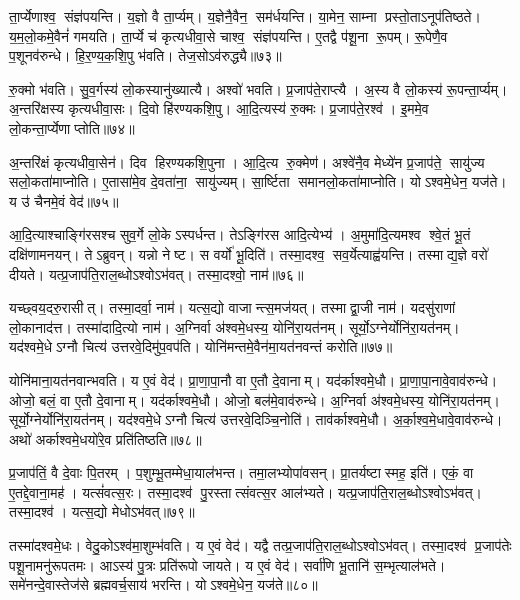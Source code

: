 ता॒र्प्येणाश्व॒ संज्ञ॑पयन्ति।
य॒ज्ञो वै ता॒र्प्यम्।
य॒ज्ञेनै॒वैन॒ सम॑र्धयन्ति।
या॒मेन॒ साम्ना प्रस्तो॒ताऽनूप॑तिष्ठते।
य॒म॒लो॒कमे॒वैनं॑ गमयति।
ता॒र्प्ये च॑ कृत्यधीवा॒से चाश्व॒ संज्ञ॑पयन्ति।
ए॒तद्वै प॑शू॒ना रू॒पम्।
रू॒पेणै॒व प॒शूनव॑रुन्धे।
हि॒र॒ण्य॒क॒शि॒पु भ॑वति।
तेज॒सोऽव॑रुद्ध्यै॥७३॥

रु॒क्मो भ॑वति।
सु॒व॒र्गस्य॑ लो॒कस्यानु॑ख्यात्यै।
अश्वो॑ भवति।
प्र॒जाप॑ते॒राप्त्यै।
अ॒स्य वै लो॒कस्य॑ रू॒पन्ता॒र्प्यम्।
अ॒न्तरि॑क्षस्य कृत्यधीवा॒सः।
दि॒वो हि॑रण्यकशि॒पु।
आ॒दि॒त्यस्य॑ रु॒क्मः।
प्र॒जाप॑ते॒रश्व॑।
इ॒ममे॒व लो॒कन्ता॒र्प्येणाप्तोति॥७४॥

अ॒न्तरि॑क्षं कृत्यधीवा॒सेन॑।
दिव हिरण्यकशि॒पुना।
आ॒दि॒त्य रु॒क्मेण॑।
अश्वे॑नै॒व मेध्ये॑न प्र॒जाप॑ते॒ सायु॑ज्य सलो॒कता॑माप्नोति।
ए॒तासा॑मे॒व दे॒वता॑ना॒ सायु॑ज्यम्।
सा॒र्ष्टिता समानलो॒कता॑माप्नोति।
योऽश्वमे॒धेन॒ यज॑ते।
य उ॑ चैनमे॒वं वेद॑॥७५॥\anuvakamend[अव॑रुध्या आप्नोत्य॒ष्टौ च॑]

आ॒दि॒त्याश्चाङ्गि॑रसश्च सुव॒र्गे लो॒केऽस्पर्धन्त।
तेऽङ्गि॑रस आदि॒त्येभ्य॑।
अ॒मुमा॑दि॒त्यमश्व श्वे॒तं भू॒तं दक्षि॑णामनयन्।
तेऽब्रुवन्।
यन्नो नेष्ट।
स वर्यो॑ भू॒दिति॑।
तस्मा॒दश्व॒ सव॒र्येत्याह्व॑यन्ति।
तस्माद्य॒ज्ञे वरो॑ दीयते।
यत्प्र॒जाप॑ति॒राल॒ब्धोऽश्वोऽभ॑वत्।
तस्मा॒दश्वो॒ नाम॑॥७६॥

यच्छ्वय॒दरु॒रासीत्।
तस्मा॒दर्वा॒ नाम॑।
यत्स॒द्यो वाजान्त्स॒मज॑यत्।
तस्माद्वा॒जी नाम॑।
यदसु॑राणां लो॒कानाद॑त्त।
तस्मा॑दादि॒त्यो नाम॑।
अ॒ग्निर्वा अ॑श्वमे॒धस्य॒ योनि॑रा॒यत॑नम्।
सूर्यो॒ऽग्नेर्योनि॑रा॒यत॑नम्।
यद॑श्वमे॒धेऽग्नौ चित्य॑ उत्तरवे॒दिमु॑प॒वप॑ति।
योनि॑मन्तमे॒वैन॑मा॒यत॑नवन्तं करोति॥७७॥

योनि॑माना॒यत॑नवान्भवति।
य ए॒वं वेद॑।
प्रा॒णा॒पा॒नौ वा ए॒तौ दे॒वानाम्।
यद॑र्काश्वमे॒धौ।
प्रा॒णा॒पा॒नावे॒वाव॑रुन्धे।
ओजो॒ बलं॒ वा ए॒तौ दे॒वानाम्।
यद॑र्काश्वमे॒धौ।
ओजो॒ बल॑मे॒वाव॑रुन्धे।
अ॒ग्निर्वा अ॑श्वमे॒धस्य॒ योनि॑रा॒यत॑नम्।
सूर्यो॒ग्नेर्योनि॑रा॒यत॑नम्।
यद॑श्वमे॒धेऽग्नौ चित्य॑ उत्तरवे॒दिञ्चि॒नोति॑।
ताव॑र्काश्वमे॒धौ।
अ॒र्का॒श्व॒मे॒धावे॒वाव॑रुन्धे।
अथो॑ अर्काश्वमे॒धयो॑रे॒व प्रति॑तिष्ठति॥७८॥\anuvakamend[नाम॑ करोति॒ सूर्यो॒ऽग्नेर्योनि॑रा॒यत॑नञ्च॒त्वारि॑ च]

प्र॒जाप॑तिं॒ वै दे॒वाः पि॒तरम्।
प॒शुम्भू॒तम्मेधा॒याल॑भन्त।
तमा॒लभ्योपा॑वसन्।
प्रा॒तर्यष्टास्मह॒ इति॑।
एकं॒ वा ए॒तद्दे॒वाना॒मह॑।
यत्सं॑वत्स॒रः।
तस्मा॒दश्व॑ पु॒रस्तात्संवत्स॒र आल॑भ्यते।
यत्प्र॒जाप॑ति॒राल॒ब्धोऽश्वोऽभ॑वत्।
तस्मा॒दश्व॑।
यत्स॒द्यो मेधोऽभ॑वत्॥७९॥

तस्मा॑दश्वमे॒धः।
वेदु॒कोऽश्व॑मा॒शुम्भ॑वति।
य ए॒वं वेद॑।
यद्वै तत्प्र॒जाप॑ति॒राल॒ब्धोऽश्वोऽभ॑वत्।
तस्मा॒दश्व॑ प्र॒जाप॑तेः पशू॒नामनु॑रूपतमः।
आऽस्य॑ पु॒त्रः प्रति॑रूपो जायते।
य ए॒वं वेद॑।
सर्वा॑णि भू॒तानि॑ स॒म्भृत्याल॑भते।
समे॑नन्दे॒वास्तेज॑से ब्रह्मवर्च॒साय॑ भरन्ति।
योऽश्वमे॒धेन॒ यज॑ते॥८०॥

